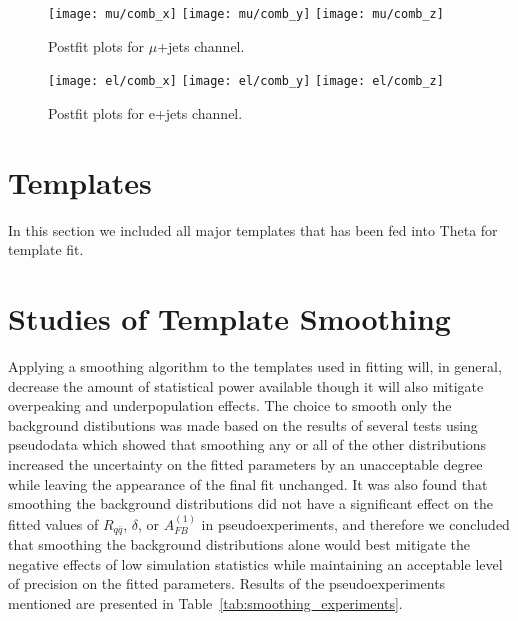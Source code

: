 \documentclass{cmspaperpdf}
\begin{document}
\begin{figure}[hbt]
  \begin{center}
    \texttt{[image: mu/comb\_x]}
    \texttt{[image: mu/comb\_y]}
    \texttt{[image: mu/comb\_z]}
  \caption{\small Postfit plots for $\mu$+jets channel.}
    \label{fig:mu_postfit}
  \end{center}
\end{figure}

\begin{figure}[hbt]
  \begin{center}
    \texttt{[image: el/comb\_x]}
    \texttt{[image: el/comb\_y]}
    \texttt{[image: el/comb\_z]}
  \caption{\small Postfit plots for e+jets channel.}
    \label{fig:el_postfit}
  \end{center}
\end{figure}

\clearpage

\section{Templates}

In this section we included all major templates that has been fed into Theta for template fit.


\clearpage
\section{Studies of Template Smoothing}
\label{appsec:smoothing}

Applying a smoothing algorithm to the templates used in fitting will, in general, decrease the amount of statistical power available though it will also mitigate overpeaking and underpopulation effects. The choice to smooth only the background distibutions was made based on the results of several tests using pseudodata which showed that smoothing any or all of the other distributions increased the uncertainty on the fitted parameters by an unacceptable degree while leaving the appearance of the final fit unchanged. It was also found that smoothing the background distributions did not have a significant effect on the fitted values of $R_{q\bar q}$, $\delta$, or $A^{(1)}_{FB}$ in pseudoexperiments, and therefore we concluded that smoothing the background distributions alone would best mitigate the negative effects of low simulation statistics while maintaining an acceptable level of precision on the fitted parameters. Results of the pseudoexperiments mentioned are presented in Table~\ref{tab:smoothing_experiments}.
\end{document}

